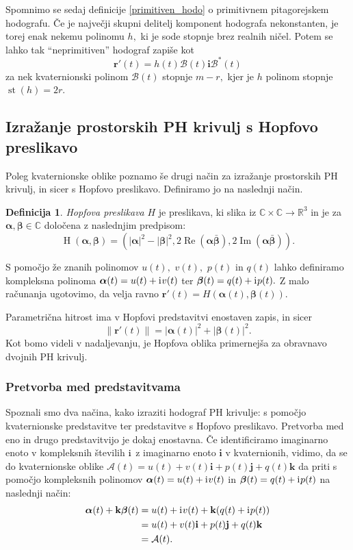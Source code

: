 \documentclass[12pt,a4paper,twoside]{article}
\newcommand{\iu}{\mathrm{i}\mkern1mu} %
\theoremstyle{definition} %
\newtheorem{definicija}{Definicija}[section]
\theoremstyle{plain} %
\theoremstyle{primerstyle}
\numberwithin{equation}{section}  %
\newcommand{\R}{\mathbb R}
\renewcommand{\C}{\mathbb C}
\newcommand{\rV}{\mathbf{r}}
\newcommand{\iV}{\mathbf{i}}
\newcommand{\jV}{\mathbf{j}}
\newcommand{\kV}{\mathbf{k}}
\newcommand{\AQ}{\mathcal{A}}
\newcommand{\BQ}{\mathcal{B}}
\newcommand{\balpha}{\boldsymbol \alpha}
\newcommand{\bbeta}{\boldsymbol \beta}
\DeclareMathOperator{\st}{st}
\DeclareMathOperator{\hopf}{H}
\DeclareMathOperator{\ReC}{Re}
\DeclareMathOperator{\ImC}{Im}
\begin{document}
Spomnimo se sedaj definicije \ref{primitiven_hodo} o primitivnem pitagorejskem hodografu. Če je največji skupni delitelj komponent hodografa nekonstanten, je torej enak nekemu polinomu $h,$ ki je sode stopnje brez realnih ničel. Potem se lahko tak ``neprimitiven'' hodograf zapiše kot
\begin{equation}
	\label{Bkvaternion}
	\rV'(t)=h(t)\BQ(t)\iV\BQ^*(t)
\end{equation}
za nek kvaternionski polinom $\BQ(t)$ stopnje $m-r,$ kjer je $h$ polinom stopnje $\st(h)=2r.$

\subsection{Izražanje prostorskih PH krivulj s Hopfovo preslikavo}
\label{hopf_poglavje}

Poleg kvaternionske oblike poznamo še drugi način za izražanje prostorskih PH krivulj, in sicer s Hopfovo preslikavo. Definiramo jo na naslednji način.
\begin{definicija}
	\label{hopf_def}
	\emph{Hopfova preslikava} $H$ je preslikava, ki slika iz $\C \times \C \to \R^3$ in je za $\balpha, \bbeta \in \C$ določena z naslednjim predpisom:
	\begin{equation}
		\label{hopf}
		\hopf(\balpha, \bbeta)=(|\balpha|^2-|\bbeta|^2,2\ReC(\balpha \bar{\bbeta}),2\ImC(\balpha \bar{\bbeta})).
	\end{equation}
\end{definicija}
S pomočjo že znanih polinomov $u(t),$ $v(t),$ $p(t)$ in $q(t)$ lahko definiramo kompleksna polinoma $\balpha(t)=u(t)+\iu v(t)$ ter $\bbeta(t)=q(t)+\iu p(t).$ Z malo računanja ugotovimo, da velja ravno $\rV'(t)=H(\balpha(t),\bbeta(t)).$

Parametrična hitrost ima v Hopfovi predstavitvi enostaven zapis, in sicer $$\lVert \rV'(t) \rVert=|\balpha(t)|^2+|\bbeta(t)|^2.$$ Kot bomo videli v nadaljevanju, je Hopfova oblika primernejša za obravnavo dvojnih PH krivulj.

\subsubsection{Pretvorba med predstavitvama}

Spoznali smo dva načina, kako izraziti hodograf PH krivulje: s pomočjo kvaternionske predstavitve ter predstavitve s Hopfovo preslikavo. Pretvorba med eno in drugo predstavitvijo je dokaj enostavna. Če identificiramo imaginarno enoto v kompleksnih številih $\iu$ z imaginarno enoto $\iV$ v kvaternionih, vidimo, da se do kvaternionske oblike $\AQ(t)=u(t)+v(t)\iV+p(t)\jV+q(t)\kV$ da priti s pomočjo kompleksnih polinomov $\balpha(t)=u(t)+\iu v(t)$ in $\bbeta(t)=q(t)+\iu p(t)$ na naslednji način:
\begin{align}
	\label{comp_to_quat}
	\balpha(t)+\kV\bbeta(t) &= u(t)+\iu v(t)+\kV(q(t)+ \iu p(t)) \nonumber \\
	&=u(t)+v(t)\iV + p(t)\jV+ q(t)\kV \nonumber \\
	&= \AQ(t).
\end{align}
\end{document}
